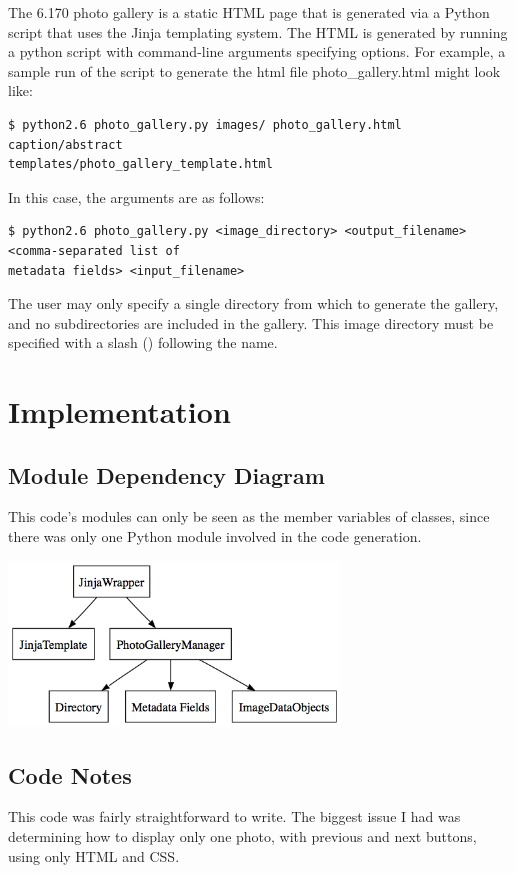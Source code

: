 \documentclass[11pt,letterpaper]{article}
\begin{document}
The 6.170 photo gallery is a static HTML page that is generated via a Python script that uses the Jinja templating system. The HTML is generated by running a python script with command-line arguments specifying options.
For example, a sample run of the script to generate the html file photo\_gallery.html might look like:
\begin{verbatim}
$ python2.6 photo_gallery.py images/ photo_gallery.html caption/abstract
templates/photo_gallery_template.html
\end{verbatim}
In this case, the arguments are as follows:
\begin{verbatim}
$ python2.6 photo_gallery.py <image_directory> <output_filename> <comma-separated list of
metadata fields> <input_filename>
\end{verbatim}

The user may only specify a single directory from which to generate the gallery, and no subdirectories are included in the gallery. This image directory must be specified with a slash (\/) following the name.


\section{Implementation}

\subsection{Module Dependency Diagram}
This code's modules can only be seen as the member variables of classes, since there was only one Python module involved in the code generation.
\begin{center}
\includegraphics[width=250pt]{dot/moddepdiagram.png}
\label{fig:ob2} 
\end{center}
\subsection{Code Notes}
This code was fairly straightforward to write. The biggest issue I had was determining how to display only one photo, with previous and next buttons, using only HTML and CSS.
\end{document}
